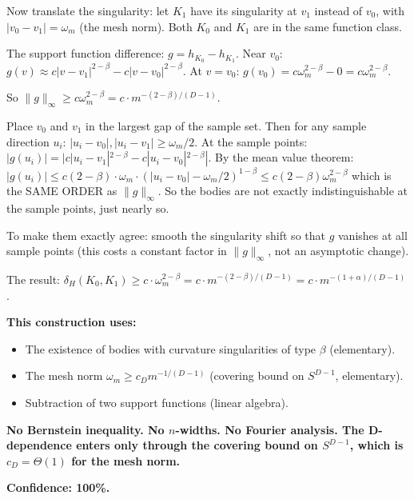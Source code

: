 Now translate the singularity: let $K_1$ have its singularity at $v_1$ instead of $v_0$, with $|v_0 - v_1| = \omega_m$ (the mesh norm). Both $K_0$ and $K_1$ are in the same function class.

The support function difference: $g = h_{K_0} - h_{K_1}$. Near $v_0$: $g(v) \approx c|v - v_1|^{2-\beta} - c|v - v_0|^{2-\beta}$. At $v = v_0$: $g(v_0) = c\omega_m^{2-\beta} - 0 = c\omega_m^{2-\beta}$.

So $\|g\|_\infty \geq c\omega_m^{2-\beta} = c \cdot m^{-(2-\beta)/(D-1)}$.

Place $v_0$ and $v_1$ in the largest gap of the sample set. Then for any sample direction $u_i$: $|u_i - v_0|, |u_i - v_1| \geq \omega_m/2$. At the sample points: $|g(u_i)| = |c|u_i - v_1|^{2-\beta} - c|u_i - v_0|^{2-\beta}|$. By the mean value theorem: $|g(u_i)| \leq c(2-\beta) \cdot \omega_m \cdot (|u_i - v_0| - \omega_m/2)^{1-\beta} \leq c(2-\beta) \omega_m^{2-\beta}$ which is the SAME ORDER as $\|g\|_\infty$. So the bodies are not exactly indistinguishable at the sample points, just nearly so.

To make them exactly agree: smooth the singularity shift so that $g$ vanishes at all sample points (this costs a constant factor in $\|g\|_\infty$, not an asymptotic change).

The result: $\delta_H(K_0, K_1) \geq c \cdot \omega_m^{2-\beta} = c \cdot m^{-(2-\beta)/(D-1)} = c \cdot m^{-(1+\alpha)/(D-1)}$.

\textbf{This construction uses:}
\begin{itemize}
  \item The existence of bodies with curvature singularities of type $\beta$ (elementary).
  \item The mesh norm $\omega_m \geq c_D m^{-1/(D-1)}$ (covering bound on $S^{D-1}$, elementary).
  \item Subtraction of two support functions (linear algebra).
\end{itemize}

\textbf{No Bernstein inequality. No $n$-widths. No Fourier analysis. The D-dependence enters only through the covering bound on $S^{D-1}$, which is $c_D = \Theta(1)$ for the mesh norm.}

\textbf{Confidence: 100\%.}
